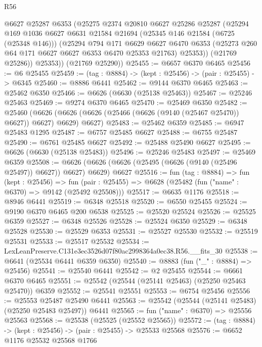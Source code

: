 \begin{lexlean}{R56}
\begin{coremodule}
          @6627
          @25287
          @6353
          (@25275
            @2374
            @20810
            @6627
            @25286
            @25287
            (@25294
              @169
              @1036
              @6627
              @6631
              @21584
              @21694
              (@25345 @146 @21584 (@6725 (@25348 @146)))
              (@25294
                @794
                @171
                @6629
                @6627
                @6470
                @6353
                (@25273 @260 @64 @171 @6627 @6627 @6353 @6470 @25353 @21763)
                @25353))
            (@21769 @25286))
          @25353))
      (@21769 @25290))
@25455 := @6657 @6370 @6465
@25456 := @6 @25455
@25459 := (tag : @8884) -> (kept : @25456) -> (pair : @25455) -> @6345
@25460 := @8886 @6441
@25462 := @9144 @6370 @6465
@25463 := @25462 @6350
@25466 := @6626 (@6630 (@25138 @25463))
@25467 := @25246 @25463
@25469 := @9274 @6370 @6465
@25470 := @25469 @6350
@25482 := @25460
    (@6626 (@6626 (@6626 (@25466 (@6626 (@9140 (@25467 @25470)) @6627)) @6627) @6629) @6627)
@25483 := @25462 @6359
@25485 := @6947 @25483 @1295
@25487 := @6757 @25485 @6627
@25488 := @6755 @25487
@25490 := @6761 @25485 @6627
@25492 := @25488 @25490 @6627
@25495 := @6626 (@6630 (@25138 @25483))
@25496 := @25246 @25483
@25497 := @25469 @6359
@25508 := @6626 (@6626 (@6626 (@25495 (@6626 (@9140 (@25496 @25497)) @6627)) @6627) @6629) @6627
@25516 := fun (tag : @8884) =>
  fun (kept : @25456) =>
  fun (pair : @25455) => @6628 (@25482 (fun ("name" : @6370) => @9142 (@25492 @25508)))
@25517 := @6635 @1176
@25518 := @8946 @6441
@25519 := @6348 @25518
@25520 := @6550 @25455
@25524 := @9190 @6370 @6465 @200 @6538
@25525 := @25520 @25524
@25526 := @25525 @6359
@25527 := @6348 @25526
@25528 := @25524 @6350
@25529 := @6348 @25528
@25530 := @25529 @6353
@25531 := @25527 @25530
@25532 := @25519 @25531
@25533 := @25517 @25532
@25534 := LexLeanPreserve.C131e3ec3526d07f80ac2998364a0ec38.R56.__fits_30
@25538 := @6641 (@25534 @6441 @6359 @6350)
@25540 := @8883 (fun ("_" : @8884) => @25456)
@25541 := @25540 @6441
@25542 := @2 @25455
@25544 := @6661 @6370 @6465
@25551 := @25542 (@25544 (@25141 @25463) (@25250 @25463 @25470)) @6359
@25552 := @25541 @25551
@25553 := @6754 @25456
@25556 := @25553 @25487 @25490 @6441
@25563 := @25542 (@25544 (@25141 @25483) (@25250 @25483 @25497)) @6441
@25565 := fun ("name" : @6370) => @25556 @25563
@25568 := @25538 (@25525 (@25552 @25565))
@25572 := (tag : @8884) -> (kept : @25456) -> (pair : @25455) -> @25533 @25568
@25576 := @6652 @1176 @25532 @25568 @1766

\end{coremodule}
\end{lexlean}
